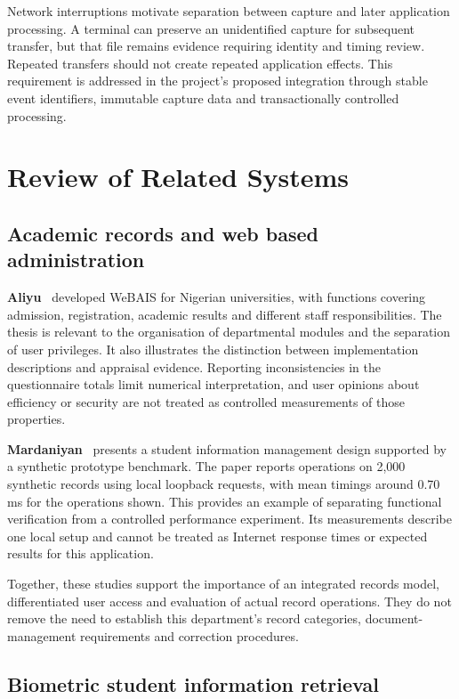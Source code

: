 Network interruptions motivate separation between capture and later application processing. A terminal can preserve an unidentified capture for subsequent transfer, but that file remains evidence requiring identity and timing review. Repeated transfers should not create repeated application effects. This requirement is addressed in the project's proposed integration through stable event identifiers, immutable capture data and transactionally controlled processing.

\section{Review of Related Systems}\label{sec:2-7}

\subsection{Academic records and web based administration}\label{sec:2-7-1}

\textbf{Aliyu}~\cite{aliyu2015} developed WeBAIS for Nigerian universities, with functions covering admission, registration, academic results and different staff responsibilities. The thesis is relevant to the organisation of departmental modules and the separation of user privileges. It also illustrates the distinction between implementation descriptions and appraisal evidence. Reporting inconsistencies in the questionnaire totals limit numerical interpretation, and user opinions about efficiency or security are not treated as controlled measurements of those properties.

\textbf{Mardaniyan}~\cite{mardaniyan2019} presents a student information management design supported by a synthetic prototype benchmark. The paper reports operations on 2,000 synthetic records using local loopback requests, with mean timings around 0.70 ms for the operations shown. This provides an example of separating functional verification from a controlled performance experiment. Its measurements describe one local setup and cannot be treated as Internet response times or expected results for this application.

Together, these studies support the importance of an integrated records model, differentiated user access and evaluation of actual record operations. They do not remove the need to establish this department's record categories, document-management requirements and correction procedures.

\subsection{Biometric student information retrieval}\label{sec:2-7-2}


